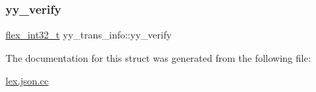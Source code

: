 \mbox{\label{structyy__trans__info_a5c9f61e770deef50bd4e697310342fe9}} 
\subsubsection{\texorpdfstring{yy\+\_\+verify}{yy\_verify}}
{\footnotesize\ttfamily \hyperlink{lex_8json_8cc_a838ce943cf44ef7769480714fc6c3ba9}{flex\+\_\+int32\+\_\+t} yy\+\_\+trans\+\_\+info\+::yy\+\_\+verify}



The documentation for this struct was generated from the following file\+:\begin{DoxyCompactItemize}
\item 
\hyperlink{lex_8json_8cc}{lex.\+json.\+cc}\end{DoxyCompactItemize}

